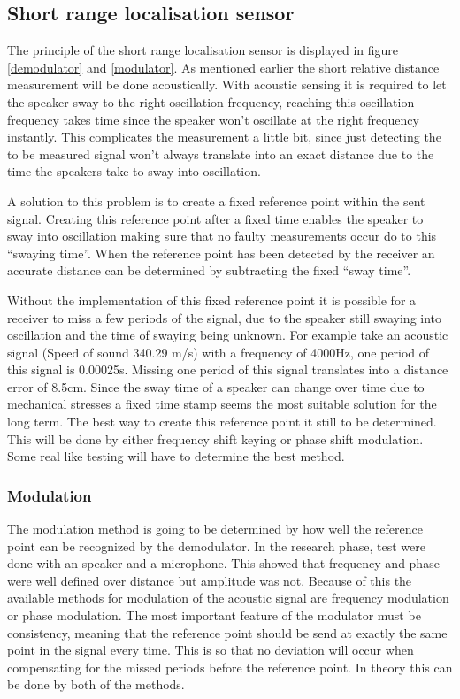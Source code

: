 \documentclass[10pt,a4paper]{article}
\begin{document}
\subsection{Short range localisation sensor}
The principle of the short range localisation sensor is displayed in figure \ref{demodulator} and \ref{modulator}. As mentioned earlier the short relative distance measurement will be done acoustically. With acoustic sensing it is required to let the speaker sway to the right oscillation frequency, reaching this oscillation frequency takes time since the speaker won't oscillate at the right frequency instantly. This complicates the measurement a little bit, since just detecting the to be measured signal won't always translate into an exact distance due to the time the speakers take to sway into oscillation.

A solution to this problem is to create a fixed reference point within the sent signal. Creating this reference point after a fixed time enables the speaker to sway into oscillation making sure that no faulty measurements occur do to this “swaying time”. When the reference point has been detected by the receiver an accurate distance can be determined by subtracting the fixed “sway time”.

Without the implementation of this fixed reference point it is possible for a receiver to miss a few periods of the signal, due to the speaker still swaying into oscillation and the time of swaying being unknown. For example take an acoustic signal (Speed of sound 340.29 m/s) with a frequency of 4000Hz, one period of this signal is 0.00025s. Missing one period of this signal translates into a distance error of 8.5cm. Since the sway time of a speaker can change over time due to mechanical stresses a fixed time stamp seems the most suitable solution for the long term. The best way to create this reference point it still to be determined. This will be done by either frequency shift keying or phase shift modulation. Some real like testing will have to determine the best method.

\subsubsection{Modulation}
The modulation method is going to be determined by how well the reference point can be recognized by the demodulator. In the research phase, test were done with an speaker and a microphone. This showed that frequency and phase were well defined over distance but amplitude was not. Because of this the available methods for modulation of the acoustic signal are frequency modulation or phase modulation. The most important feature of the modulator must be consistency, meaning that the reference point should be send at exactly the same point in the signal every time. This is so that no deviation will occur when compensating for the missed periods before the reference point. In theory this can be done by both of the methods. 
\end{document}
